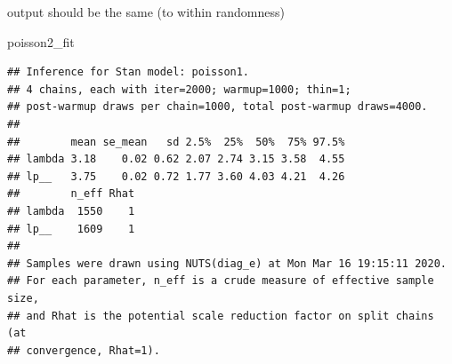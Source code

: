 \documentclass[
  ignorenonframetext,
]{beamer}
\newenvironment{Shaded}{\begin{snugshade}}{\end{snugshade}}
\newcommand{\NormalTok}[1]{#1}
\begin{document}
\begin{frame}[fragile]{output should be the same (to within randomness)}
\protect\hypertarget{output-should-be-the-same-to-within-randomness}{}

\begin{Shaded}
\begin{Highlighting}[]
\NormalTok{poisson2_fit}
\end{Highlighting}
\end{Shaded}

\begin{verbatim}
## Inference for Stan model: poisson1.
## 4 chains, each with iter=2000; warmup=1000; thin=1; 
## post-warmup draws per chain=1000, total post-warmup draws=4000.
## 
##        mean se_mean   sd 2.5%  25%  50%  75% 97.5%
## lambda 3.18    0.02 0.62 2.07 2.74 3.15 3.58  4.55
## lp__   3.75    0.02 0.72 1.77 3.60 4.03 4.21  4.26
##        n_eff Rhat
## lambda  1550    1
## lp__    1609    1
## 
## Samples were drawn using NUTS(diag_e) at Mon Mar 16 19:15:11 2020.
## For each parameter, n_eff is a crude measure of effective sample size,
## and Rhat is the potential scale reduction factor on split chains (at 
## convergence, Rhat=1).
\end{verbatim}

\end{frame}
\end{document}
